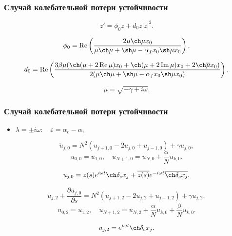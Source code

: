 \documentclass[fullscreen=true, unicode, bookmarks=false]{beamer}
\begin{document}
\begin{frame}
\frametitle{ Случай колебательной потери устойчивости }

$$
z' = \phi_0 z + d_0 z |z|^2.
$$

\vfill

$$ \phi_0 = \mbox{Re} \left(\dfrac{2 \mu \ch \mu x_0}{\mu \ch \mu + \sh \mu - \alpha_f x_0 \sh \mu x_0} \right), $$

$$ d_0 = \mbox{Re} \left( \dfrac{3 \beta \mu (\ch (\mu + 2\,\mbox{Re}\,\mu) x_0 + \ch (\mu + 2 \,\mbox{Im}\,\mu) x_0 + 2 \ch \overline{\mu} x_0)}{2(\mu \ch \mu + \sh \mu - \alpha_f x_0 \sh \mu x_0)} \right). $$

\vfill

$$ \mu = \sqrt{-\gamma + i \omega}. $$

\end{frame}

\begin{frame}
\frametitle{ Случай колебательной потери устойчивости }

\begin{itemize}
\item { $ \lambda = \pm i \omega: \quad \varepsilon=\alpha_c-\alpha, $
}
\end{itemize}

$$
\dot u_{j,0} = N^2(u_{j+1,0} - 2u_{j,0} + u_{j-1,0}) + \gamma u_{j,0},
$$
$$
u_{0,0} = u_{1,0}, \quad u_{N+1,0} = u_{N,0} + \dfrac{\alpha}{N}u_{k,0}.
$$

\vfill

$$ u_{j,0} = z(s) e^{i \omega t} \ch \delta_c x_j + \overline{z(s)} e^{-i \omega t} \overline{\ch \delta_c x_j}. $$

$$
\dot u_{j,2} + \frac{\partial u_{j,0}}{\partial s} = N^2(u_{j+1,2} - 2u_{j,2} + u_{j-1,2}) + \gamma u_{j,2},
$$
$$
u_{0,2} = u_{1,2}, \quad u_{N+1,2} = u_{N,2} + \dfrac{\alpha}{N}u_{k,0} + \dfrac{\beta}{N}u_{k,0}.
$$

\vfill

$$ u_{j,2} = e^{i \omega t} \ch \delta_c x_j. $$

\end{frame}
\end{document}

